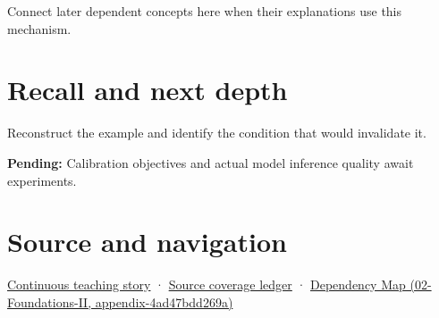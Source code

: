 Connect later dependent concepts here when their explanations use this mechanism.

\section{Recall and next depth}\label{appendix-d5da3eaabaef-recall-and-next-depth}

Reconstruct the example and identify the condition that would invalidate it.

\textbf{Pending:} Calibration objectives and actual model inference quality await experiments.

\section{Source and navigation}\label{appendix-d5da3eaabaef-source-and-navigation}

\href{Continuous\%20Notes/Computing\%20Foundations\%20-\%20From\%20Bits\%20to\%20C++\%20and\%20Systems\%20APIs\#Choosing\%20what\%20information\%20to\%20keep}{Continuous teaching story} · \hyperref[appendix-fd090d982a15]{Source coverage ledger} · \href{../02-Foundations-II/main.pdf\#nameddest=appendix-4ad47bdd269a}{Dependency Map (02-Foundations-II, appendix-4ad47bdd269a)}
